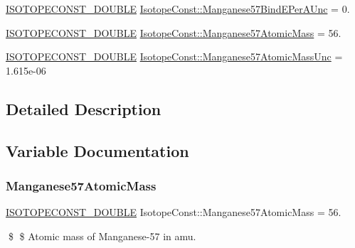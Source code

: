 \begin{DoxyCompactItemize}
\mbox{\hyperlink{group___isotope_const-_macros_ga8f45a7272ce02c0b4c65c44636ed719a}{I\+S\+O\+T\+O\+P\+E\+C\+O\+N\+S\+T\+\_\+\+D\+O\+U\+B\+LE}} \mbox{\hyperlink{group___isotope_const-_manganese-_mn57_ga78c8e872ce794bb0f9f23b5fffd5e38a}{Isotope\+Const\+::\+Manganese57\+Bind\+E\+Per\+A\+Unc}} = 0.
\item 
\mbox{\hyperlink{group___isotope_const-_macros_ga8f45a7272ce02c0b4c65c44636ed719a}{I\+S\+O\+T\+O\+P\+E\+C\+O\+N\+S\+T\+\_\+\+D\+O\+U\+B\+LE}} \mbox{\hyperlink{group___isotope_const-_manganese-_mn57_ga9230d529baf05ac70bf1e17a2f2bb05e}{Isotope\+Const\+::\+Manganese57\+Atomic\+Mass}} = 56.
\item 
\mbox{\hyperlink{group___isotope_const-_macros_ga8f45a7272ce02c0b4c65c44636ed719a}{I\+S\+O\+T\+O\+P\+E\+C\+O\+N\+S\+T\+\_\+\+D\+O\+U\+B\+LE}} \mbox{\hyperlink{group___isotope_const-_manganese-_mn57_gaf19fea9f717955d5944d29e31efaba65}{Isotope\+Const\+::\+Manganese57\+Atomic\+Mass\+Unc}} = 1.\+615e-\/06
\end{DoxyCompactItemize}


\subsection{Detailed Description}


\subsection{Variable Documentation}
\mbox{\label{group___isotope_const-_manganese-_mn57_ga9230d529baf05ac70bf1e17a2f2bb05e}} 
\subsubsection{\texorpdfstring{Manganese57\+Atomic\+Mass}{Manganese57AtomicMass}}
{\footnotesize\ttfamily \mbox{\hyperlink{group___isotope_const-_macros_ga8f45a7272ce02c0b4c65c44636ed719a}{I\+S\+O\+T\+O\+P\+E\+C\+O\+N\+S\+T\+\_\+\+D\+O\+U\+B\+LE}} Isotope\+Const\+::\+Manganese57\+Atomic\+Mass = 56.}

\$ \$ Atomic mass of Manganese-\/57 in amu. \mbox{\label{group___isotope_const-_manganese-_mn57_gaf19fea9f717955d5944d29e31efaba65}} 
